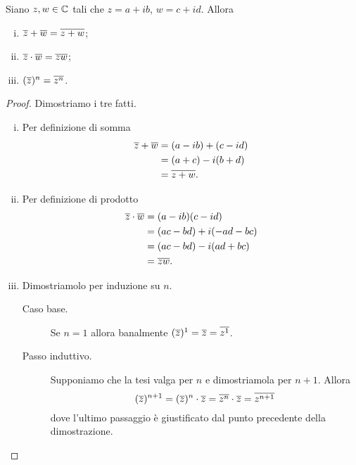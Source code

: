 \begin{proposition}\label{somma_prodotto_tra_coniugati}
    Siano $z, w \in \mathbb{C}$ tali che $z = a+ib$, $w = c + id$. Allora \begin{enumerate}[(i)]
        \item $\overline{z} + \overline{w} = \overline{z + w}$;
        \item $\overline{z}\cdot\overline{w} = \overline{zw}$;
        \item $(\overline{z})^n = \overline{z^n}$.
    \end{enumerate}
\end{proposition}
\begin{proof}
    Dimostriamo i tre fatti.
    \begin{enumerate}[(i)]
        \item Per definizione di somma \begin{alignat*}
            {1}
            \overline{z} + \overline{w} &= (a-ib) + (c - id)\\
            &= (a+c) - i(b+d)\\
            &= \overline{z + w}.
        \end{alignat*}
        \item Per definizione di prodotto \begin{alignat*}
            {1}
            \overline{z}\cdot\overline{w} &= (a-ib)(c - id)\\
            &= (ac - bd) + i(-ad-bc)\\
            &= (ac - bd) - i(ad+bc)\\
            &= \overline{zw}.
        \end{alignat*}
        \item Dimostriamolo per induzione su $n$.
        \begin{description}
            \item[Caso base.] Se $n = 1$ allora banalmente $(\overline{z})^1 = \overline{z} = \overline{z^1}$.
            \item[Passo induttivo.] Supponiamo che la tesi valga per $n$ e dimostriamola per $n+1$. Allora \[
                (\overline{z})^{n+1} = (\overline{z})^{n} \cdot \overline{z} = \overline{z^n} \cdot \overline{z} = \overline{z^{n+1}}
            \] dove l'ultimo passaggio è giustificato dal punto precedente della dimostrazione. \qedhere
        \end{description}
    \end{enumerate}
\end{proof}

